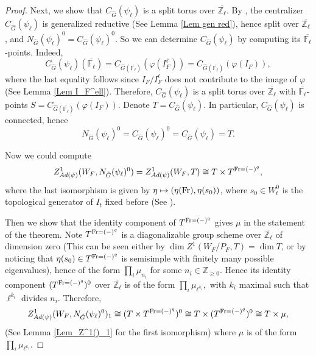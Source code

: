 \begin{theorem}
\begin{proof}
    	Next, we show that $C_{\hat{G}}(\psi_{\ell})$ is a split torus over $\overline{\mathbb{Z}_{\ell}}$. By \cite[Subsection 3.1]{dat2022ihes}, the centralizer $C_{\hat{G}}(\psi_{\ell})$ is generalized reductive (See Lemma \ref{Lem gen red}), hence split over $\overline{\mathbb{Z}_{\ell}}$, and $N_{\hat{G}}(\psi_{\ell})^0=C_{\hat{G}}(\psi_{\ell})^0$. So we can determine $C_{\hat{G}}(\psi_{\ell})$ by computing its $\overline{\mathbb{F}_{\ell}}$-points. Indeed,
    	$$C_{\hat{G}}(\psi_{\ell})(\overline{\mathbb{F}_{\ell}})=C_{\hat{G}(\overline{\mathbb{F}_{\ell}})}(\varphi(I_F^\ell))=C_{\hat{G}(\overline{\mathbb{F}_{\ell}})}(\varphi(I_F)),$$
    	where the last equality follows since $I_F/I_F^{\ell}$ does not contribute to the image of $\varphi$ (See Lemma \ref{Lem I_F^ell}). Therefore, $C_{\hat{G}}(\psi_{\ell})$ is a split torus over $\overline{\mathbb{Z}_{\ell}}$ with $\overline{\mathbb{F}_{\ell}}$-points $S=C_{\hat{G}(\overline{\mathbb{F}_{\ell}})}(\varphi(I_F))$. Denote $T=C_{\hat{G}}(\psi_{\ell})$. In particular, $C_{\hat{G}}(\psi_{\ell})$  is connected, hence 
    	\begin{equation}\label{Equation: T}
    	N_{\hat{G}}(\psi_{\ell})^0=C_{\hat{G}}(\psi_{\ell})^0=C_{\hat{G}}(\psi_{\ell})=T.
    	\end{equation}
    	
    	
    	Now we could compute
    	$$Z^1_{Ad(\psi)}(W_F, N_{\hat{G}}(\psi_{\ell})^0)=Z^1_{Ad(\psi)}(W_F, T) \cong T \times T^{\operatorname{Fr}=(-)^q},$$
    	where the last isomorphism is given by $\eta \mapsto (\eta(\operatorname{Fr}), \eta(s_0))$, where $s_0 \in W_t^0$ is the topological generator of $I_t$ fixed before (See \cite[Example 3.14]{dat2022ihes}).
    	
    	Then we show that the identity component of $T^{\operatorname{Fr}=(-)^q}$ gives $\mu$ in the statement of the theorem. Note $T^{\operatorname{Fr}=(-)^q}$ is a diagonalizable group scheme over $\overline{\mathbb{Z}_{\ell}}$ of dimension zero (This can be seen either by $\dim Z^1(W_F/P_F, T)=\dim T$, or by noticing that $\eta(s_0) \in T^{\operatorname{Fr}=(-)^q}$ is semisimple with finitely many possible eigenvalues), hence of the form $\prod_i\mu_{n_i}$ for some $n_i \in \mathbb{Z}_{\geq 0}$. Hence its identity component $(T^{\operatorname{Fr}=(-)^q})^0$ over $\overline{\mathbb{Z}_{\ell}}$ is of the form $\prod_i\mu_{\ell^{k_i}},$ with $k_i$ maximal such that $\ell^{k_i}$ divides $n_i$. Therefore, 
    	$$Z^1_{Ad(\psi)}(W_F, N_{\hat{G}}(\psi_{\ell})^0)_1 \cong (T \times T^{\operatorname{Fr}=(-)^q})^0 \cong T \times (T^{\operatorname{Fr}=(-)^q})^0 \cong T \times \mu,$$
    	(See Lemma \ref{Lem_Z^1()_1} for the first isomorphism) where $\mu$ is of the form $\prod_i\mu_{\ell^{k_i}}$.
    	

\end{proof}
\end{theorem}
